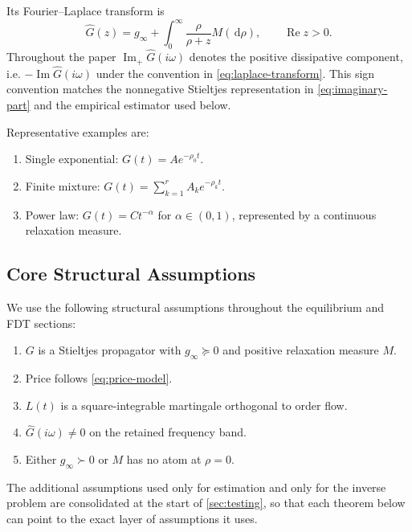 \documentclass[11pt]{article}
\newcommand{\Ghat}{\widehat{G}}
\newcommand{\RePart}{\operatorname{Re}}
\newcommand{\ImPart}{\operatorname{Im}_{\!+}}
\newcommand{\dd}{\,\mathrm{d}}
\newcommand{\REV}{}
\begin{document}
Its Fourier--Laplace transform is
\begin{equation}\label{eq:laplace-transform}
  \Ghat(z)=g_\infty + \int_0^\infty \frac{\rho}{\rho+z} M(\dd\rho), \qquad \RePart z>0.
\end{equation}
Throughout the paper $\ImPart \Ghat(i\omega)$ denotes the positive dissipative component, i.e. $-\operatorname{Im}\Ghat(i\omega)$ under the convention in \cref{eq:laplace-transform}. This sign convention matches the nonnegative Stieltjes representation in \cref{eq:imaginary-part} and the empirical estimator used below.

Representative examples are:
\begin{enumerate}[label=\arabic*.]
  \item Single exponential: $G(t)=A e^{-\rho_0 t}$.
  \item Finite mixture: $G(t)=\sum_{k=1}^r A_k e^{-\rho_k t}$.
  \item Power law: $G(t)=Ct^{-\alpha}$ for $\alpha\in(0,1)$, represented by a continuous relaxation measure.
\end{enumerate}

\subsection{Core Structural Assumptions}
\REV
We use the following structural assumptions throughout the equilibrium and FDT sections:
\begin{enumerate}[label=\textbf{A\arabic*}.,start=0]
  \item $G$ is a Stieltjes propagator with $g_\infty\succeq 0$ and positive relaxation measure $M$.
  \item Price follows \cref{eq:price-model}.
  \item $L(t)$ is a square-integrable martingale orthogonal to order flow.
  \item $\Ghat(i\omega)\neq 0$ on the retained frequency band.
  \item Either $g_\infty\succ 0$ or $M$ has no atom at $\rho=0$.
\end{enumerate}
The additional assumptions used only for estimation and only for the inverse problem are consolidated at the start of \cref{sec:testing}, so that each theorem below can point to the exact layer of assumptions it uses.
\end{document}
